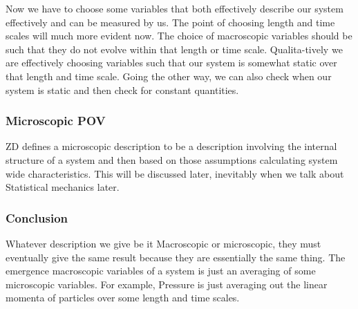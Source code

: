    Now we have to choose some variables that both effectively describe our system effectively and 
   can be measured by us. The point of choosing length and time scales will much more evident now.
    The choice of macroscopic variables should be such that they do not evolve within that length 
   or time scale. Qualita-tively we are effectively choosing variables such that our system is 
   somewhat static over that length and time scale. Going the other way, we can also check when our
    system is static and then check for constant quantities. 
   \subsubsection{Microscopic POV}
   ZD defines a microscopic description to be a description involving the internal structure of a 
   system and then based on those assumptions calculating system wide characteristics. This will 
   be discussed later, inevitably when we talk about Statistical mechanics later.
   \subsubsection{Conclusion}
   Whatever description we give be it Macroscopic or microscopic, they must eventually give the 
   same result because they are essentially the same thing. The emergence macroscopic variables 
   of a system is just an averaging of some microscopic variables. For example, Pressure is just 
   averaging out the linear momenta of particles over some length and time scales.
